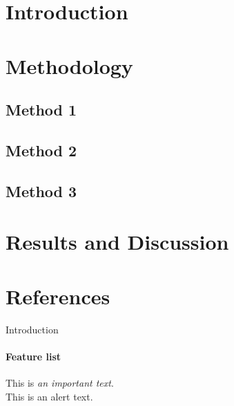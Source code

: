 \documentclass{beamer}
\begin{document}
\section{Introduction}
\section{Methodology}
\subsection{Method 1}
\subsection{Method 2}
\subsection{Method 3}
\section{Results and Discussion}
\section*{References}

\begin{frame}{Introduction}
  \framesubtitle{Feature list}
  
  This is \emph{an important text}.\\
  This is an \alert{alert text}.

\end{frame}
\end{document}
